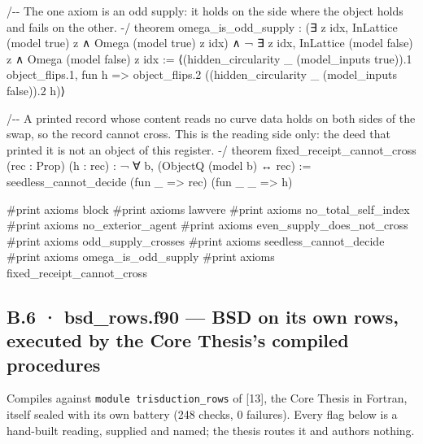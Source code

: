\documentclass[10pt,twocolumn]{article}
\newenvironment{Shaded}{}{}
\newcommand{\NormalTok}[1]{#1}
\providecommand{\NormalTok}[1]{#1}
\providecommand{\NormalTok}[1]{#1}
\begin{document}
\begin{strip}
\begin{Shaded}
\begin{Highlighting}[]
\NormalTok{/{-}{-} The one axiom is an odd supply: it holds on the side where the object holds and fails on the other. {-}/}
\NormalTok{theorem omega\_is\_odd\_supply :}
\NormalTok{    (∃ z idx, InLattice (model true) z ∧ Omega (model true) z idx) ∧}
\NormalTok{    ¬ ∃ z idx, InLattice (model false) z ∧ Omega (model false) z idx :=}
\NormalTok{  ⟨(hidden\_circularity \_ (model\_inputs true)).1 object\_flips.1,}
\NormalTok{   fun h =\textgreater{} object\_flips.2 ((hidden\_circularity \_ (model\_inputs false)).2 h)⟩}

\NormalTok{/{-}{-} A printed record whose content reads no curve data holds on both sides of the swap, so the record cannot}
\NormalTok{    cross. This is the reading side only: the deed that printed it is not an object of this register. {-}/}
\NormalTok{theorem fixed\_receipt\_cannot\_cross (rec : Prop) (h : rec) : ¬ ∀ b, (ObjectQ (model b) ↔ rec) :=}
\NormalTok{  seedless\_cannot\_decide (fun \_ =\textgreater{} rec) (fun \_ \_ =\textgreater{} h)}

\NormalTok{\#print axioms block}
\NormalTok{\#print axioms lawvere}
\NormalTok{\#print axioms no\_total\_self\_index}
\NormalTok{\#print axioms no\_exterior\_agent}
\NormalTok{\#print axioms even\_supply\_does\_not\_cross}
\NormalTok{\#print axioms odd\_supply\_crosses}
\NormalTok{\#print axioms seedless\_cannot\_decide}
\NormalTok{\#print axioms omega\_is\_odd\_supply}
\NormalTok{\#print axioms fixed\_receipt\_cannot\_cross}
\end{Highlighting}
\end{Shaded}
\end{strip}

\subsection{B.6 · bsd\_rows.f90 --- BSD on its own rows, executed by the
Core Thesis's compiled
procedures}\label{b.6-bsd_rows.f90-bsd-on-its-own-rows-executed-by-the-core-thesiss-compiled-procedures}

Compiles against \texttt{module\ trisduction\_rows} of {[}13{]}, the
Core Thesis in Fortran, itself sealed with its own battery (248 checks,
0 failures). Every flag below is a hand-built reading, supplied and
named; the thesis routes it and authors nothing.
\end{document}
